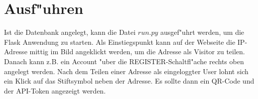 \section{Ausf{"u}hren}\label{sec:ausfuhren}
Ist die Datenbank angelegt, kann die Datei $run.py$ ausgef{"u}hrt werden, um die Flask Anwendung zu starten.
Als Einstiegspunkt kann auf der Webseite die IP-Adresse mittig im Bild angeklickt werden, um die Adresse als Visitor zu teilen.
Danach kann z.B. ein Account {"u}ber die REGISTER-Schaltfl{"a}che rechts oben angelegt werden.
Nach dem Teilen einer Adresse als eingeloggter User lohnt sich ein Klick auf das Stiftsymbol neben der Adresse.
Es sollte dann ein QR-Code und der API-Token angezeigt werden.

